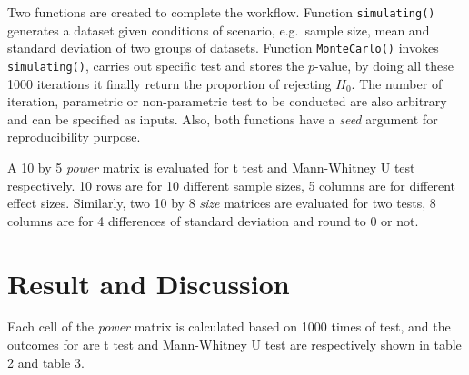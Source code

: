 \documentclass[]{article}
\begin{document}
Two functions are created to complete the workflow. Function
\texttt{simulating()} generates a dataset given conditions of scenario,
e.g.~sample size, mean and standard deviation of two groups of datasets.
Function \texttt{MonteCarlo()} invokes \texttt{simulating()}, carries
out specific test and stores the \(p\)-value, by doing all these 1000
iterations it finally return the proportion of rejecting \(H_0\). The
number of iteration, parametric or non-parametric test to be conducted
are also arbitrary and can be specified as inputs. Also, both functions
have a \emph{seed} argument for reproducibility purpose.

A 10 by 5 \emph{power} matrix is evaluated for t test and Mann-Whitney U
test respectively. 10 rows are for 10 different sample sizes, 5 columns
are for different effect sizes. Similarly, two 10 by 8 \emph{size}
matrices are evaluated for two tests, 8 columns are for 4 differences of
standard deviation and round to 0 or not.

\hypertarget{result-and-discussion}{%
\section{Result and Discussion}\label{result-and-discussion}}

Each cell of the \emph{power} matrix is calculated based on 1000 times
of test, and the outcomes for are t test and Mann-Whitney U test are
respectively shown in table 2 and table 3.
\end{document}
